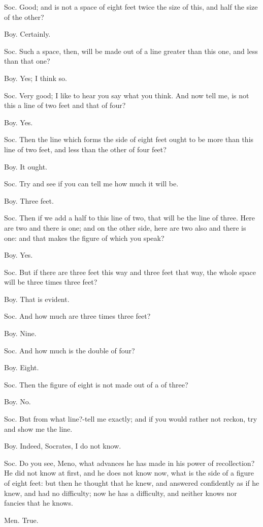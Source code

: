 Soc. Good; and is not a space of eight feet twice the size of this,
and half the size of the other? 

Boy. Certainly. 

Soc. Such a space, then, will be made out of a line greater than this
one, and less than that one? 

Boy. Yes; I think so. 

Soc. Very good; I like to hear you say what you think. And now tell
me, is not this a line of two feet and that of four? 

Boy. Yes. 

Soc. Then the line which forms the side of eight feet ought to be
more than this line of two feet, and less than the other of four feet?

Boy. It ought. 

Soc. Try and see if you can tell me how much it will be.

Boy. Three feet. 

Soc. Then if we add a half to this line of two, that will be the line
of three. Here are two and there is one; and on the other side, here
are two also and there is one: and that makes the figure of which
you speak? 

Boy. Yes. 

Soc. But if there are three feet this way and three feet that way,
the whole space will be three times three feet? 

Boy. That is evident. 

Soc. And how much are three times three feet? 

Boy. Nine. 

Soc. And how much is the double of four? 

Boy. Eight. 

Soc. Then the figure of eight is not made out of a of three?

Boy. No. 

Soc. But from what line?-tell me exactly; and if you would rather
not reckon, try and show me the line. 

Boy. Indeed, Socrates, I do not know. 

Soc. Do you see, Meno, what advances he has made in his power of recollection?
He did not know at first, and he does not know now, what is the side
of a figure of eight feet: but then he thought that he knew, and answered
confidently as if he knew, and had no difficulty; now he has a difficulty,
and neither knows nor fancies that he knows. 

Men. True. 

